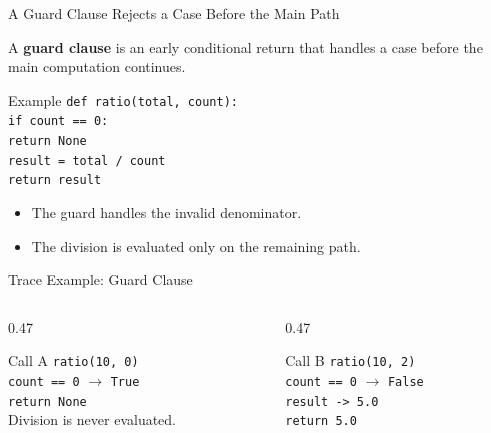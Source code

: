 \documentclass[aspectratio=169,10pt]{beamer}
\begin{document}
\begin{frame}{A Guard Clause Rejects a Case Before the Main Path}
  \begin{cpdefinition}
    A \textbf{guard clause} is an early conditional return that handles a case before the main computation continues.
  \end{cpdefinition}

  \begin{block}{Example}
    \texttt{def ratio(total, count):}\\
    \hspace*{0.20in}\texttt{if count == 0:}\\
    \hspace*{0.40in}\texttt{return None}\\
    \hspace*{0.20in}\texttt{result = total / count}\\
    \hspace*{0.20in}\texttt{return result}
  \end{block}

  \begin{itemize}
    \item The guard handles the invalid denominator.
    \item The division is evaluated only on the remaining path.
  \end{itemize}
\end{frame}

\begin{frame}{Trace Example: Guard Clause}
  \begin{columns}[T,onlytextwidth]
    \begin{column}{0.47\textwidth}
      \begin{block}{Call A}
        \texttt{ratio(10, 0)}\\[0.08in]
        \texttt{count == 0} $\to$ \texttt{True}\\
        \texttt{return None}\\[0.08in]
        Division is never evaluated.
      \end{block}
    \end{column}

    \begin{column}{0.47\textwidth}
      \begin{block}{Call B}
        \texttt{ratio(10, 2)}\\[0.08in]
        \texttt{count == 0} $\to$ \texttt{False}\\
        \texttt{result -> 5.0}\\
        \texttt{return 5.0}
      \end{block}
    \end{column}
  \end{columns}
\end{frame}
\end{document}

